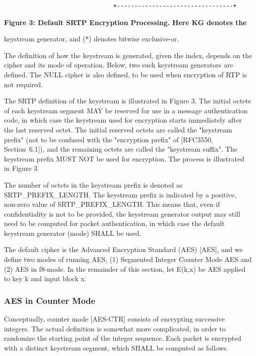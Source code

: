 \documentclass{article}
\begin{document}
\begin{verbatim}
                               +---------------------------------+
\end{verbatim}

\begin{center}
\textbf{Figure 3: Default SRTP Encryption Processing.  Here KG denotes the}
\end{center}

keystream generator, and (*) denotes bitwise exclusive-or.

The definition of how the keystream is generated, given the index, depends on the cipher and its mode of operation.  Below, two such keystream generators are defined.  The NULL cipher is also defined, to be used when encryption of RTP is not required.

The SRTP definition of the keystream is illustrated in Figure 3.  The initial octets of each keystream segment MAY be reserved for use in a message authentication code, in which case the keystream used for encryption starts immediately after the last reserved octet.  The initial reserved octets are called the "keystream prefix" (not to be confused with the "encryption prefix" of [RFC3550, Section~6.1]), and the remaining octets are called the "keystream suffix".  The keystream prefix MUST NOT be used for encryption.  The process is illustrated in Figure 3.

The number of octets in the keystream prefix is denoted as SRTP\_PREFIX\_LENGTH.  The keystream prefix is indicated by a positive, non-zero value of SRTP\_PREFIX\_LENGTH.  This means that, even if confidentiality is not to be provided, the keystream generator output may still need to be computed for packet authentication, in which case the default keystream generator (mode) SHALL be used.

The default cipher is the Advanced Encryption Standard (AES) [AES], and we define two modes of running AES, (1) Segmented Integer Counter Mode AES and (2) AES in f8-mode.  In the remainder of this section, let E(k,x) be AES applied to key k and input block x.

\subsubsection{AES in Counter Mode}

Conceptually, counter mode [AES-CTR] consists of encrypting successive integers.  The actual definition is somewhat more complicated, in order to randomize the starting point of the integer sequence.  Each packet is encrypted with a distinct keystream segment, which SHALL be computed as follows.
\end{document}
